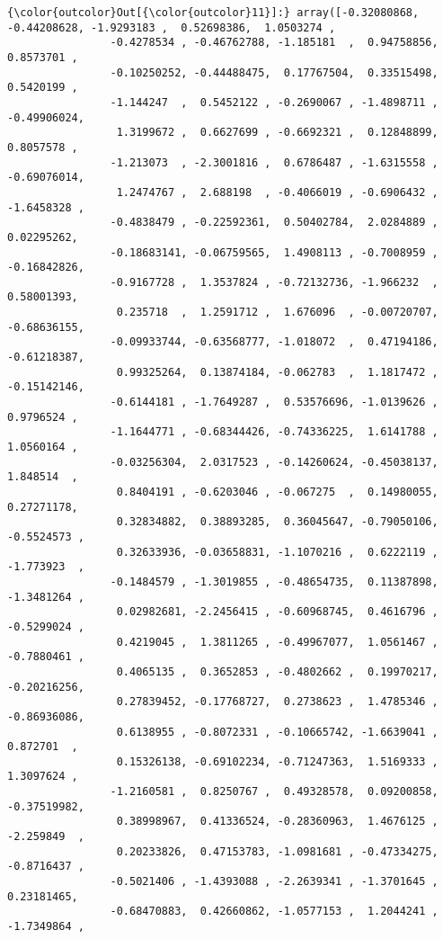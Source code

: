 \documentclass[11pt]{article}
\begin{document}
\begin{Verbatim}[commandchars=\\\{\}]
{\color{outcolor}Out[{\color{outcolor}11}]:} array([-0.32080868, -0.44208628, -1.9293183 ,  0.52698386,  1.0503274 ,
                -0.4278534 , -0.46762788, -1.185181  ,  0.94758856,  0.8573701 ,
                -0.10250252, -0.44488475,  0.17767504,  0.33515498,  0.5420199 ,
                -1.144247  ,  0.5452122 , -0.2690067 , -1.4898711 , -0.49906024,
                 1.3199672 ,  0.6627699 , -0.6692321 ,  0.12848899,  0.8057578 ,
                -1.213073  , -2.3001816 ,  0.6786487 , -1.6315558 , -0.69076014,
                 1.2474767 ,  2.688198  , -0.4066019 , -0.6906432 , -1.6458328 ,
                -0.4838479 , -0.22592361,  0.50402784,  2.0284889 ,  0.02295262,
                -0.18683141, -0.06759565,  1.4908113 , -0.7008959 , -0.16842826,
                -0.9167728 ,  1.3537824 , -0.72132736, -1.966232  ,  0.58001393,
                 0.235718  ,  1.2591712 ,  1.676096  , -0.00720707, -0.68636155,
                -0.09933744, -0.63568777, -1.018072  ,  0.47194186, -0.61218387,
                 0.99325264,  0.13874184, -0.062783  ,  1.1817472 , -0.15142146,
                -0.6144181 , -1.7649287 ,  0.53576696, -1.0139626 ,  0.9796524 ,
                -1.1644771 , -0.68344426, -0.74336225,  1.6141788 ,  1.0560164 ,
                -0.03256304,  2.0317523 , -0.14260624, -0.45038137,  1.848514  ,
                 0.8404191 , -0.6203046 , -0.067275  ,  0.14980055,  0.27271178,
                 0.32834882,  0.38893285,  0.36045647, -0.79050106, -0.5524573 ,
                 0.32633936, -0.03658831, -1.1070216 ,  0.6222119 , -1.773923  ,
                -0.1484579 , -1.3019855 , -0.48654735,  0.11387898, -1.3481264 ,
                 0.02982681, -2.2456415 , -0.60968745,  0.4616796 , -0.5299024 ,
                 0.4219045 ,  1.3811265 , -0.49967077,  1.0561467 , -0.7880461 ,
                 0.4065135 ,  0.3652853 , -0.4802662 ,  0.19970217, -0.20216256,
                 0.27839452, -0.17768727,  0.2738623 ,  1.4785346 , -0.86936086,
                 0.6138955 , -0.8072331 , -0.10665742, -1.6639041 ,  0.872701  ,
                 0.15326138, -0.69102234, -0.71247363,  1.5169333 ,  1.3097624 ,
                -1.2160581 ,  0.8250767 ,  0.49328578,  0.09200858, -0.37519982,
                 0.38998967,  0.41336524, -0.28360963,  1.4676125 , -2.259849  ,
                 0.20233826,  0.47153783, -1.0981681 , -0.47334275, -0.8716437 ,
                -0.5021406 , -1.4393088 , -2.2639341 , -1.3701645 ,  0.23181465,
                -0.68470883,  0.42660862, -1.0577153 ,  1.2044241 , -1.7349864 ,

\end{Verbatim}
\end{document}
